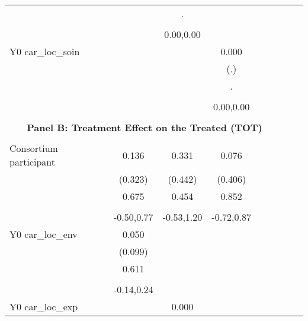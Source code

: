 \begin{table}[!h]
\begin{adjustbox}{width=\columnwidth,center}
\begin{tabular}{l*{8}{c}}
                    &                     &           .         &                     \\
                    &                     &                     &                     \\
                    &                     &   0.00,0.00         &                     \\
Y0 car\_loc\_soin     &                     &                     &       0.000         \\
                    &                     &                     &         (.)         \\
                    &                     &                     &           .         \\
                    &                     &                     &                     \\
                    &                     &                     &   0.00,0.00         \\
\hline \\ \multicolumn{7}{c}{\textbf{Panel B: Treatment Effect on the Treated (TOT)}} \\\\[-1ex]
Consortium participant&       0.136         &       0.331         &       0.076         \\
                    &     (0.323)         &     (0.442)         &     (0.406)         \\
                    &       0.675         &       0.454         &       0.852         \\
                    &                     &                     &                     \\
                    &  -0.50,0.77         &  -0.53,1.20         &  -0.72,0.87         \\
Y0 car\_loc\_env      &       0.050         &                     &                     \\
                    &     (0.099)         &                     &                     \\
                    &       0.611         &                     &                     \\
                    &                     &                     &                     \\
                    &  -0.14,0.24         &                     &                     \\
Y0 car\_loc\_exp      &                     &       0.000         &                     \\

\end{tabular}
\end{adjustbox}
\end{table}
